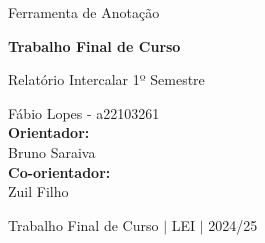 \begin{titlepage}
    \BgThispage
    \centering
    \vspace*{7cm}
    
    {\fontsize{50}{1.15}\selectfont Ferramenta de Anotação}
    \vspace{3cm}

    {\fontsize{29}{1.15}\selectfont
        \textbf{Trabalho Final de Curso}\\
    }

    \vspace{1\baselineskip}
    {\fontsize{14}{1.15}\selectfont
        Relatório Intercalar 1º Semestre
    }

    \vspace{5.5cm}
    {\fontsize{10}{16}\selectfont
        {Fábio Lopes - a22103261} \\
        {\textbf{Orientador:}} \\
        {Bruno Saraiva} \\
        {\textbf{Co-orientador:}} \\
        {Zuil Filho}

        \vspace{0.3cm}
        Trabalho Final de Curso $|$ LEI $|$ {2024/25}
    }
\end{titlepage}
